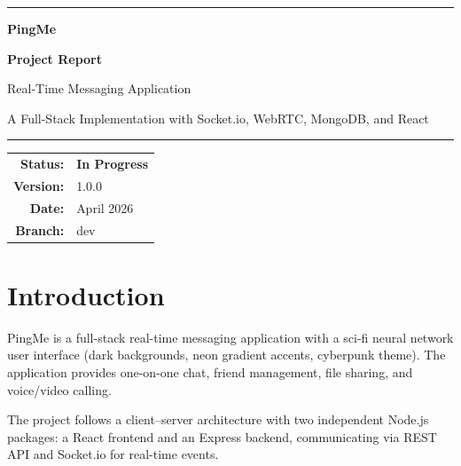 \documentclass[12pt,a4paper]{article}
\newcommand{\pingme}{PingMe\xspace}
\begin{document}
\thispagestyle{empty}
\vspace*{2cm}
\begin{center}
    \rule{0.95\linewidth}{0.5pt}
    \vspace{1cm}

    {\Huge\bfseries\color{accentCyan}\pingme{}}
    \vspace{0.4cm}

    {\LARGE\bfseries\color{heading}Project Report}
    \vspace{0.8cm}

    {\Large\sffamily\color{offWhite}Real-Time Messaging Application}
    \vspace{0.6cm}

    {\large\sffamily\color{muted}A Full-Stack Implementation with
    Socket.io, WebRTC, MongoDB, and React}

    \vspace{2cm}
    \rule{0.95\linewidth}{0.5pt}
    \vspace{2cm}

    \begin{tabular}{rl}
        \textbf{Status:} & \color{success}\textbf{In Progress} \\
        \textbf{Version:} & 1.0.0 \\
        \textbf{Date:}   & April 2026 \\
        \textbf{Branch:} & dev \\
    \end{tabular}
\end{center}
\newpage

\tableofcontents
\newpage

\section{Introduction}
\label{sec:introduction}

\pingme{} is a full-stack real-time messaging application with a sci-fi neural network
user interface (dark backgrounds, neon gradient accents, cyberpunk theme). The application
provides one-on-one chat, friend management, file sharing, and voice/video calling.

The project follows a client--server architecture with two independent Node.js packages:
a React frontend and an Express backend, communicating via REST API and Socket.io for
real-time events.
\end{document}
